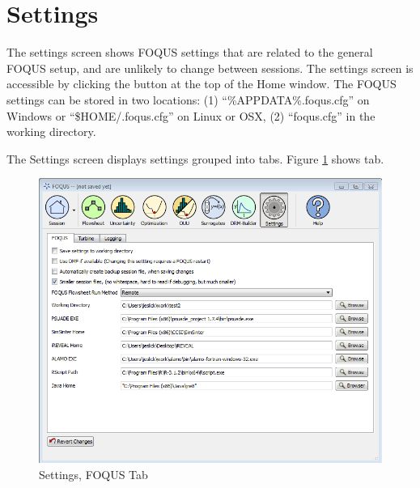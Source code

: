 \section{Settings}
\label{section.settings}

The settings screen shows FOQUS settings that are related to the general FOQUS setup, and are unlikely to change between sessions. The settings screen is accessible by clicking the  button at the top of the Home window. The FOQUS settings can be stored in two locations: (1) ``\%APPDATA\%\bs.foqus.cfg'' on Windows or ``\$HOME/.foqus.cfg'' on Linux or OSX, (2) ``foqus.cfg'' in the working directory.

The Settings screen displays settings grouped into tabs. Figure \ref{fig.settings.options} shows  tab. 

\begin{figure}[H]
	\begin{center}
		\includegraphics[scale=0.55]{Chapt_flowsheet/figs/settings_options}
		\caption{Settings, FOQUS Tab}
		\label{fig.settings.options}
	\end{center}
\end{figure}

